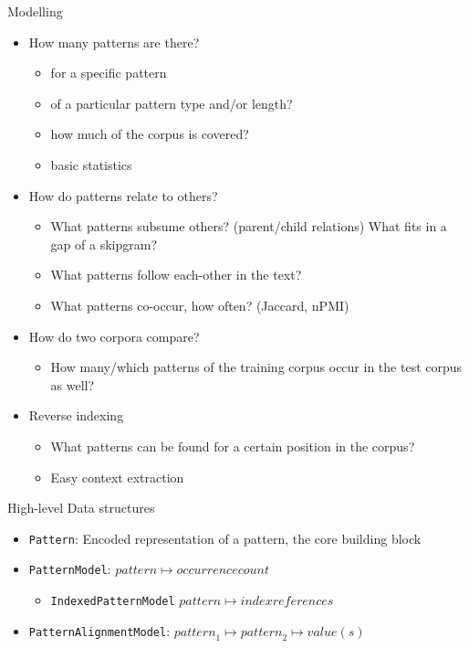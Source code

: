 \documentclass[compress]{beamer}
\begin{document}
\begin{frame}
  \begin{block}{Modelling}
    \begin{itemize}
      \item How many patterns are there?
      \begin{itemize}
        \item for a specific pattern
        \item of a particular pattern type and/or length?
        \item how much of the corpus is covered?
        \item basic statistics
      \end{itemize}
      \item How do patterns relate to others?
      \begin{itemize}
        \item What patterns subsume others? (parent/child relations)  What fits
          in a gap of a skipgram?
        \item What patterns follow each-other in the text? 
        \item What patterns co-occur, how often? (Jaccard, nPMI) 
      \end{itemize}
      \item How do two corpora compare?
      \begin{itemize}
        \item How many/which patterns of the training corpus occur in the
          test corpus as well?
      \end{itemize}
      \item Reverse indexing
      \begin{itemize}
          \item What patterns can be found for a certain position in the corpus?
          \item Easy context extraction
      \end{itemize}
    \end{itemize}
  \end{block}
\end{frame}



\begin{frame}

  \begin{block}{High-level Data structures}
    \begin{itemize}
      \item \texttt{Pattern}: Encoded representation of a pattern, the core
        building block
      \item \texttt{PatternModel}: ${pattern} \mapsto {occurrencecount}$
      \begin{itemize}
        \item \texttt{IndexedPatternModel} ${pattern} \mapsto {indexreferences}$
      \end{itemize}
      \item \texttt{PatternAlignmentModel}:  ${pattern}_1 \mapsto {pattern}_2 \mapsto {value(s)}$
    \end{itemize}
  \end{block}

\end{frame}
\end{document}
